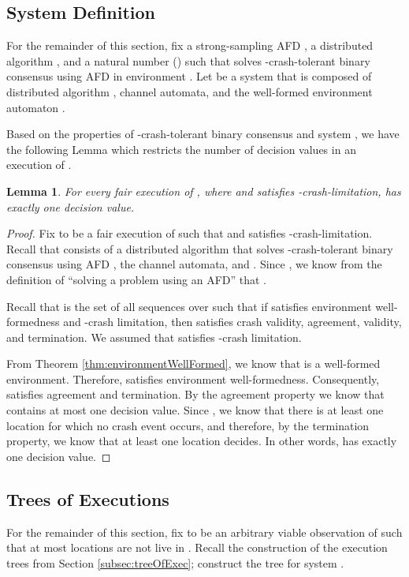 \documentclass[11pt]{article}
\numberwithin{theorem}{section}
\newtheorem{lemma}[theorem]{Lemma}
\begin{document}
\subsection{System Definition}
\label{subsec:consensusSystem}

For the remainder of this section, fix a strong-sampling AFD , a distributed algorithm , and a natural number  () such that  solves -crash-tolerant
binary consensus using AFD  in environment .
Let  be a system that is composed of distributed
algorithm , channel automata, and the well-formed environment
automaton .

Based on the properties of -crash-tolerant binary consensus and
system , we have the following Lemma which
restricts the number of decision values in an execution of
.



\begin{lemma}
\label{lem:fairExecExactlyOneDecision}
For every
 fair execution  of , where
 and 
satisfies -crash-limitation,  has exactly
one decision value.
\end{lemma}





\begin{proof}
Fix  to be a fair execution of  such that
 and 
satisfies -crash-limitation. Recall that  consists of
a distributed algorithm  that solves -crash-tolerant binary
consensus using AFD , the channel automata, and
. Since , we know
from the definition of ``solving a problem using an AFD'' that
.


Recall that  is the set of all sequences  over 
such that if  satisfies environment well-formedness and -crash
limitation, then  satisfies crash validity, agreement, validity,
and termination. We assumed that  satisfies
-crash limitation.

From Theorem \ref{thm:environmentWellFormed}, we know that
 is a well-formed environment. Therefore,  satisfies environment well-formedness. Consequently,
 satisfies agreement and termination. By the
agreement property we know that  contains at
most one decision value. Since , we know that there is at least one location for which no crash event occurs, and therefore, by the
termination property, we know that at least one location decides. In
other words,   has exactly one decision value.
\end{proof}

\subsection{Trees of Executions}\label{subsec:consensusTree}
For the remainder of this section, fix  to be an arbitrary
viable observation of  such that at most  locations are not
live in . Recall the construction of the execution trees from Section \ref{subsec:treeOfExec}; construct
the tree  for system . 
\end{document}
